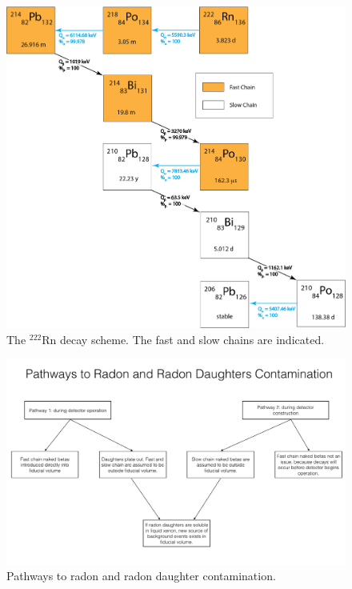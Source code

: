 \begin{figure}[ht]
    \centering
    \includegraphics[width=5.0in]{figures/radon/222Rn_simple_fastslowchains.png}
    \caption{The $^{222}$Rn decay scheme. The fast and slow chains are indicated.}
    \label{fig:Rn222}
\end{figure}

\begin{figure}[ht]
    \centering
    \includegraphics[width=6.0in]{figures/radon/Rn_pathways.png}
    \caption{Pathways to radon and radon daughter contamination.}
    \label{fig:flow_chart}
\end{figure}


